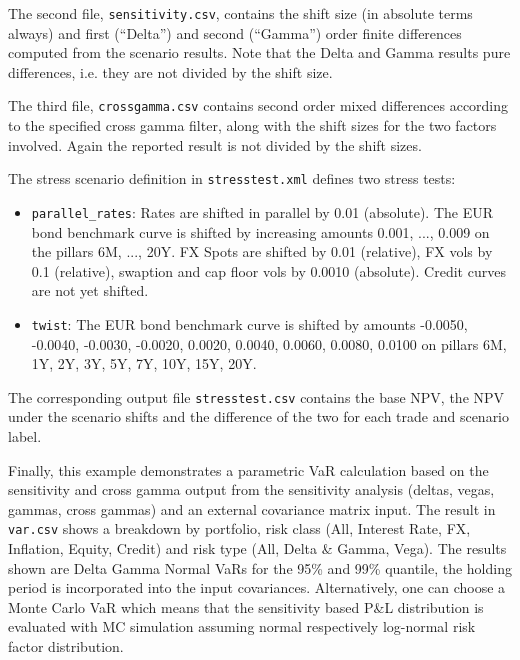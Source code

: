 \documentclass[12pt, a4paper]{article}
\begin{document}
{The second file, {\tt sensitivity.csv}, contains the shift size (in absolute terms always) and first (``Delta'') and second
(``Gamma'') order finite differences computed from the scenario results. Note that the Delta and Gamma results pure
differences, i.e. they are not divided by the shift size.

The third file, {\tt crossgamma.csv} contains second order mixed differences according to the specified cross gamma
filter, along with the shift sizes for the two factors involved. Again the reported result is not divided by the shift
sizes.

The stress scenario definition in {\tt stresstest.xml} defines two stress tests:

\begin{itemize}
\item {\tt parallel\_rates}: Rates are shifted in parallel by 0.01 (absolute). The EUR bond benchmark curve is shifted by
  increasing amounts 0.001, ..., 0.009 on the pillars 6M, ..., 20Y. FX Spots are shifted by 0.01 (relative), FX vols by
  0.1 (relative), swaption and cap floor vols by 0.0010 (absolute).
  Credit curves are not yet shifted.
\item {\tt twist}: The EUR bond benchmark curve is shifted by amounts -0.0050, -0.0040, -0.0030, -0.0020, 0.0020,
  0.0040, 0.0060, 0.0080, 0.0100 on pillars 6M, 1Y, 2Y, 3Y, 5Y, 7Y, 10Y, 15Y, 20Y.
\end{itemize}

The corresponding output file {\tt stresstest.csv} contains the base NPV, the NPV under the scenario shifts and the
difference of the two for each trade and scenario label.

\medskip
Finally, this example demonstrates a parametric VaR calculation based on the sensitivity and cross gamma output from the sensitivity analysis (deltas, vegas, gammas, cross gammas) and an external covariance matrix input. The result in {\tt var.csv} shows a breakdown by portfolio, risk class (All, Interest Rate, FX, Inflation, Equity, Credit) and risk type (All, Delta \& Gamma, Vega). The results shown are Delta Gamma Normal VaRs for the 95\% and 99\% quantile, the holding period is incorporated into the input covariances. Alternatively, one can choose a Monte Carlo VaR which means that the sensitivity based P\&L distribution is evaluated with MC simulation assuming normal respectively log-normal risk factor distribution. 
 
}
\end{document}
